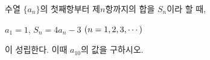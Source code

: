 수열 $\{a_n\}$의 첫째항부터 제$n$항까지의 합을 $S_n$이라 할 때, \par\smallskip\noindent\hspace*{1.5em}$a_1=1$, $S_n=4a_n-3$ $(n=1{,}\mkern3mu\mathopen{}2{,}\mkern3mu\mathopen{}3{,}\mkern3mu\mathopen{}\cdots)$\par\smallskip\noindent 이 성립한다. 이때 $a_{10}$의 값을 구하시오.
